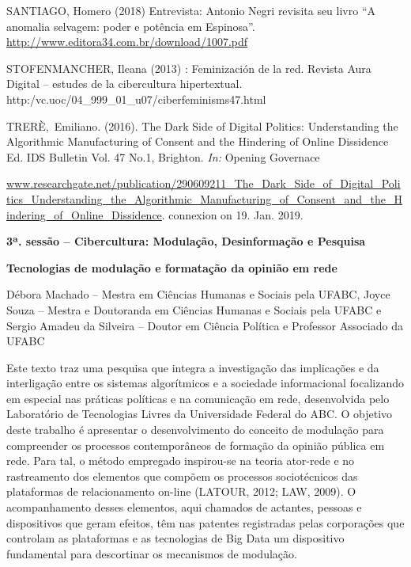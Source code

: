SANTIAGO, Homero (2018) Entrevista: Antonio Negri revisita seu livro ``A
anomalia selvagem: poder e potência em Espinosa''.
\url{http://www.editora34.com.br/download/1007.pdf}

STOFENMANCHER, Ileana (2013) : Feminización de la red. Revista Aura
Digital -- estudes de la cibercultura hipertextual.
http:/vc.uoc/04\_999\_01\_u07/ciberfeminisms47.html

TRERÈ,~Emiliano. (2016). The Dark Side of Digital Politics:
Understanding the Algorithmic Manufacturing of Consent and the Hindering
of Online Dissidence Ed. IDS Bulletin Vol. 47 No.1, Brighton. \emph{In:}
Opening Governace

\href{http://www.researchgate.net/publication/290609211_The_Dark_Side_of_Digital_Politics_Understanding_the_Algorithmic_Manufacturing_of_Consent_and_the_Hindering_of_Online_Dissidence}{www.researchgate.net/publication/290609211\_The\_Dark\_Side\_of\_Digital\_Politics\_Understanding\_the\_Algorithmic\_Manufacturing\_of\_Consent\_and\_the\_Hindering\_of\_Online\_Dissidence}.
connexion on 19. Jan. 2019.

\textbf{3ª. sessão -- Cibercultura: Modulação, Desinformação e Pesquisa}

\textbf{Tecnologias de modulação e formatação da opinião em rede}

Débora Machado -- Mestra em Ciências Humanas e Sociais pela UFABC, Joyce
Souza -- Mestra e Doutoranda em Ciências Humanas e Sociais pela UFABC e
Sergio Amadeu da Silveira -- Doutor em Ciência Política e Professor
Associado da UFABC

Este texto traz uma pesquisa que integra a investigação das implicações
e da interligação entre os sistemas algorítmicos e a sociedade
informacional focalizando em especial nas práticas políticas e na
comunicação em rede, desenvolvida pelo Laboratório de Tecnologias Livres
da Universidade Federal do ABC. O objetivo deste trabalho é apresentar o
desenvolvimento do conceito de modulação para compreender os processos
contemporâneos de formação da opinião pública em rede. Para tal, o
método empregado inspirou-se na teoria ator-rede e no rastreamento dos
elementos que compõem os processos sociotécnicos das plataformas de
relacionamento on-line (LATOUR, 2012; LAW, 2009). O acompanhamento
desses elementos, aqui chamados de actantes, pessoas e dispositivos que
geram efeitos, têm nas patentes registradas pelas corporações que
controlam as plataformas e as tecnologias de Big Data um dispositivo
fundamental para descortinar os mecanismos de modulação.

